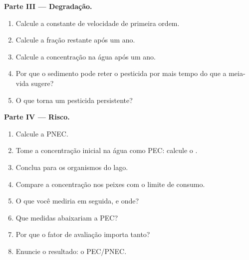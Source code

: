 \begin{problem}
\medskip\noindent\textbf{Parte III --- Degradação.}
\begin{enumerate}[resume]
  \item Calcule a constante de velocidade de primeira ordem.
  \item Calcule a fração restante após um ano.
  \item Calcule a concentração na água após um ano.
  \item Por que o sedimento pode reter o pesticida por mais tempo do que a meia-vida sugere?
  \item O que torna um pesticida persistente?
\end{enumerate}

\medskip\noindent\textbf{Parte IV --- Risco.}
\begin{enumerate}[resume]
  \item Calcule a PNEC.
  \item Tome a concentração inicial na água como PEC: calcule o .
  \item Conclua para os organismos do lago.
  \item Compare a concentração nos peixes com o limite de consumo.
  \item O que você mediria em seguida, e onde?
  \item Que medidas abaixariam a PEC?
  \item Por que o fator de avaliação importa tanto?
  \item Enuncie o resultado: o  PEC/PNEC.
\end{enumerate}
\end{problem}

